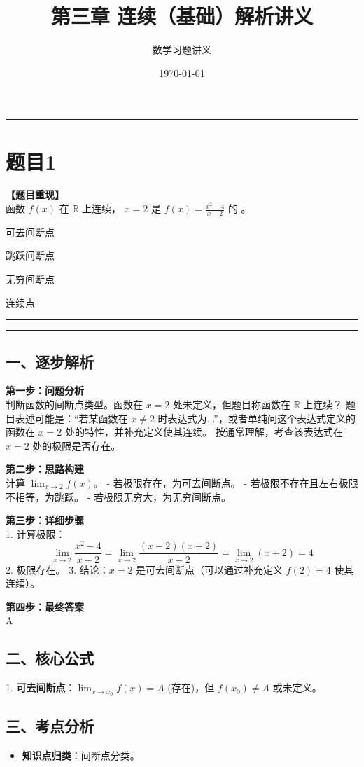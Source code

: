 \documentclass[12pt, a4paper]{ctexart}
\newcommand{\TopSeparator}{
    \par\noindent\rule{\textwidth}{1.5pt}\vspace{0.5em} %
}
\newcommand{\AnalysisSeparator}{
    \par\noindent\rule{\textwidth}{0.5pt}\vspace{0.2em}\hrule\vspace{0.5em} %
}
\newenvironment{RedAnalysis}{
    \par
    \color{red} %
}{
    \par
    \color{black} %
}
\newcommand{\choicesFour}[4]{
    \begin{enumerate}[label=\Alph*., itemsep=0pt, parsep=0pt, topsep=5pt, labelsep=0.5em]
        \begin{minipage}{0.22\linewidth} \item #1 \end{minipage}
        \begin{minipage}{0.22\linewidth} \item #2 \end{minipage}
        \begin{minipage}{0.22\linewidth} \item #3 \end{minipage}
        \begin{minipage}{0.22\linewidth} \item #4 \end{minipage}
    \end{enumerate}
}
\begin{document}
\title{\textbf{第三章 连续（基础）解析讲义}}
\author{数学习题讲义}
\date{\today}
\maketitle

\TopSeparator
\section*{题目1}

\textbf{【题目重现】} \\
函数 $ f(x) $ 在 $\mathbb{R}$ 上连续， $x=2$ 是 $ f(x)=\frac{x^{2}-4}{x-2} $ 的 \underline{\hspace{1cm}}。
\choicesFour{可去间断点}{跳跃间断点}{无穷间断点}{连续点}

\AnalysisSeparator

\begin{RedAnalysis}

\subsection*{一、逐步解析}

\textbf{第一步：问题分析} \\
判断函数的间断点类型。函数在 $x=2$ 处未定义，但题目称函数在 $\mathbb{R}$ 上连续？
题目表述可能是：“若某函数在 $x \ne 2$ 时表达式为...”，或者单纯问这个表达式定义的函数在 $x=2$ 处的特性，并补充定义使其连续。
按通常理解，考查该表达式在 $x=2$ 处的极限是否存在。

\textbf{第二步：思路构建} \\
计算 $\lim_{x\to 2} f(x)$。
- 若极限存在，为可去间断点。
- 若极限不存在且左右极限不相等，为跳跃。
- 若极限无穷大，为无穷间断点。

\textbf{第三步：详细步骤} \\
1. 计算极限：
   \[ \lim_{x\to 2} \frac{x^2-4}{x-2} = \lim_{x\to 2} \frac{(x-2)(x+2)}{x-2} = \lim_{x\to 2} (x+2) = 4 \]
2. 极限存在。
3. 结论：$x=2$ 是可去间断点（可以通过补充定义 $f(2)=4$ 使其连续）。

\textbf{第四步：最终答案} \\
A

\subsection*{二、核心公式}
1. \textbf{可去间断点}：$\lim_{x\to x_0} f(x) = A$ (存在)，但 $f(x_0) \ne A$ 或未定义。

\subsection*{三、考点分析}
\begin{itemize}
    \item \textbf{知识点归类}：间断点分类。
\end{itemize}

\end{RedAnalysis}
\end{document}

